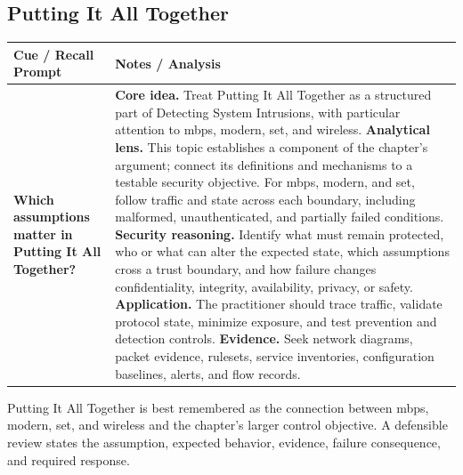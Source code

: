\documentclass[11pt]{article}
\newcommand{\CornellHeader}{%
\rowcolor{Navy}\color{white}\bfseries Cue / Recall Prompt & \color{white}\bfseries Notes / Analysis\\\hline}
\newcommand{\CornellRow}[2]{%
\cellcolor{CueGray}\RaggedRight\textbf{#1} & \RaggedRight #2\\\hline}
\begin{document}
\subsection*{Putting It All Together}
\begin{longtable}{>{\RaggedRight\arraybackslash}p{}|>{\RaggedRight\arraybackslash}p{}}
\CornellHeader
\CornellRow{Which assumptions matter in Putting It All Together?}{\textbf{Core idea.} Treat Putting It All Together as a structured part of Detecting System Intrusions, with particular attention to mbps, modern, set, and wireless. \textbf{Analytical lens.} This topic establishes a component of the chapter's argument; connect its definitions and mechanisms to a testable security objective. For mbps, modern, and set, follow traffic and state across each boundary, including malformed, unauthenticated, and partially failed conditions. \textbf{Security reasoning.} Identify what must remain protected, who or what can alter the expected state, which assumptions cross a trust boundary, and how failure changes confidentiality, integrity, availability, privacy, or safety. \textbf{Application.} The practitioner should trace traffic, validate protocol state, minimize exposure, and test prevention and detection controls. \textbf{Evidence.} Seek network diagrams, packet evidence, rulesets, service inventories, configuration baselines, alerts, and flow records.}
\end{longtable}
\begin{topicsummary}
Putting It All Together is best remembered as the connection between mbps, modern, set, and wireless and the chapter's larger control objective. A defensible review states the assumption, expected behavior, evidence, failure consequence, and required response.
\end{topicsummary}
\end{document}
